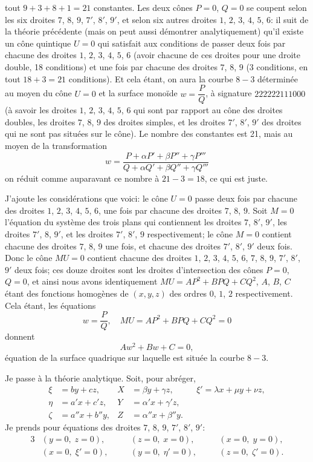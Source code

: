 \documentclass[11pt,a4paper]{article}
\begin{document}
\noindent tout $9+3+8+1=21$ constantes. Les deux c\^{o}nes $P=0$, $Q=0$ se coupent selon les six droites $7$, $8$, $9$, $7'$, $8'$, $9'$, et selon six autres droites $1$, $2$, $3$, $4$, $5$, $6$: il suit de la th\'{e}orie pr\'{e}c\'{e}dente (mais on peut aussi d\'{e}montrer analytiquement) qu'il existe un c\^{o}ne quintique $U=0$ qui satisfait aux conditions de passer deux fois par chacune des droites $1$, $2$, $3$, $4$, $5$, $6$ (avoir chacune de ces droites pour une droite double, 18 conditions) et une fois par chacune des droites $7$, $8$, $9$ (3 conditions, en tout $18+3=21$ conditions). Et cela \'{e}tant, on aura la courbe $8-3$ d\'{e}termin\'{e}e au moyen du c\^{o}ne $U=0$ et la surface mono\"{i}de $w=\dfrac{P}{Q}$, \`{a} signature $222222111000$ (\`{a} savoir les droites $1$, $2$, $3$, $4$, $5$, $6$ qui sont par rapport au c\^{o}ne des droites doubles, les droites $7$, $8$, $9$ des droites simples, et les droites $7'$, $8'$, $9'$ des droites qui ne sont pas situ\'{e}es sur le c\^{o}ne). Le nombre des constantes est 21, mais au moyen de la transformation
\[
w=\frac{P+\alpha P'+\beta P''+\gamma P'''}{Q+\alpha Q'+\beta Q''+\gamma Q'''}
\]
on r\'{e}duit comme auparavant ce nombre \`{a} $21-3=18$, ce qui est juste.

\medskip

J'ajoute les consid\'{e}rations que voici: le c\^{o}ne $U=0$ passe deux fois par chacune des droites $1$, $2$, $3$, $4$, $5$, $6$, une fois par chacune des droites $7$, $8$, $9$. Soit $M=0$ l'\'{e}quation du syst\`{e}me des trois plans qui contiennent les droites $7$, $8'$, $9'$, les droites $7'$, $8$, $9'$, et les droites $7'$, $8'$, $9$ respectivement; le c\^{o}ne $M=0$ contient chacune des droites $7$, $8$, $9$ une fois, et chacune des droites $7'$, $8'$, $9'$ deux fois. Donc le c\^{o}ne $MU=0$ contient chacune des droites $1$, $2$, $3$, $4$, $5$, $6$, $7$, $8$, $9$, $7'$, $8'$, $9'$ deux fois; ces douze droites sont les droites d'intersection des c\^{o}nes $P=0$, $Q=0$, et ainsi nous avons identiquement $MU=AP^2+BPQ+CQ^2$, $A$, $B$, $C$ \'{e}tant des fonctions homog\`{e}nes de $(x,y,z)$ des ordres $0$, $1$, $2$ respectivement. Cela \'{e}tant, les \'{e}quations
\[
w=\frac{P}{Q}, \quad MU=AP^2+BPQ+CQ^2=0
\]
donnent
\[
Aw^2+Bw+C=0,
\]
\'{e}quation de la surface quadrique sur laquelle est situ\'{e}e la courbe $8-3$.

\medskip

Je passe \`{a} la th\'{e}orie analytique. Soit, pour abr\'{e}ger,
\begin{align*}
\xi &= by+cz, & X &= \beta y+\gamma z, & &\xi' = \lambda x+\mu y+\nu z, \\
\eta &= a'x+c'z, & Y &= \alpha'x+\gamma'z, & & \\
\zeta &= a''x+b''y, & Z &= \alpha''x+\beta''y. & &
\end{align*}
Je prends pour \'{e}quations des droites $7$, $8$, $9$, $7'$, $8'$, $9'$:
\begin{alignat*}{3}
&(y=0,\; z=0), \quad &&(z=0,\; x=0), \quad &&(x=0,\; y=0), \\
&(x=0,\; \xi'=0), \quad &&(y=0,\; \eta'=0), \quad &&(z=0,\; \zeta'=0).
\end{alignat*}
\clearpage
\end{document}
